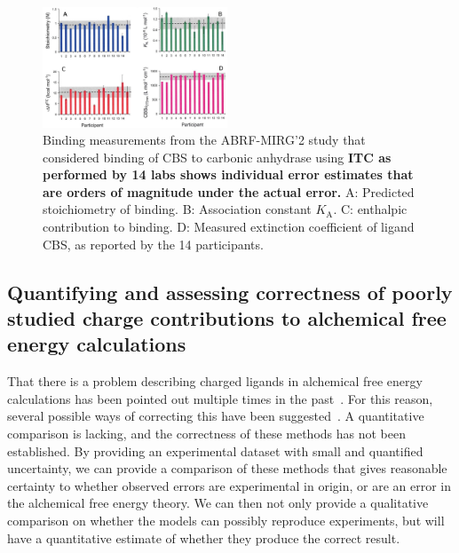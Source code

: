 \documentclass[10pt,final]{article}
\begin{document}
\begin{figure}[H]
	\centering
	\includegraphics[width=0.49\textwidth]{figures/cbs_ca_II.PNG}
	\caption{Binding measurements from the ABRF-MIRG'2 study that considered binding of CBS to carbonic anhydrase using \textbf{ITC as performed by 14 labs shows individual error estimates that are orders of magnitude under the actual error.} A: Predicted stoichiometry of binding. B: Association constant $K_\mathrm{A}$. C: enthalpic contribution to binding. D: Measured extinction coefficient of ligand CBS, as reported by the 14 participants.~\cite{Myszka2003a}}
	\label{figure:abrf-mirg2}
\end{figure}

\subsection*{Quantifying and assessing correctness of poorly studied charge contributions to alchemical free energy calculations}
That there is a problem describing charged ligands in alchemical free energy calculations has been pointed out multiple times in the past~\cite{Rocklin2013b,Muddana2014a}. 
For this reason, several possible ways of correcting this have been suggested~\cite{Reif2013a,Rocklin2013a}. A quantitative comparison is lacking, and the correctness of these methods has not been established. 
By providing an experimental dataset with small and quantified uncertainty, we can provide a comparison of these methods that gives reasonable certainty to whether observed errors are experimental in origin, or are an error in the alchemical free energy theory. 
We can then not only provide a qualitative comparison on whether the models can possibly reproduce experiments, but will have a quantitative estimate of whether they produce the correct result.
\end{document}
